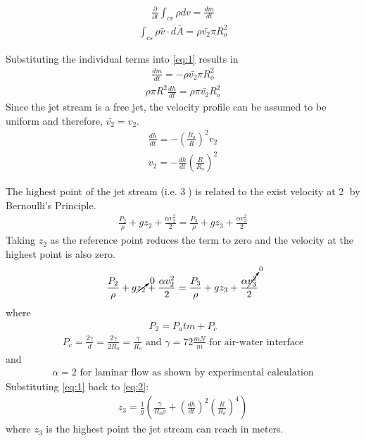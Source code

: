 \documentclass{article}
\begin{document}
\begin{align*}
\frac{\partial}{\partial{t}} \int_{cv} \rho dv = \frac{dm}{dt}
\end{align*}
\begin{align*}
\int_{cs} \rho \bar{v} \cdot d\bar{A} = \rho \bar{v_2} \pi R_o^2
\end{align*}

Substituting the individual terms into \eqref{eq:1} results in
\begin{align*}
\frac{dm}{dt} = - \rho \bar{v_2} \pi R_o^2
\end{align*}
\begin{align*}
\rho \pi R^2 \frac{dh}{dt} = \rho \pi \bar{v_2} R_o^2
\end{align*}
Since the jet stream is a free jet, the velocity profile can be assumed to be uniform and therefore, $\bar{v_2} = v_2$.
\begin{align*}
\frac{dh}{dt} = -(\frac{R_o}{R})^2 v_2
\end{align*}
\begin{align}
v_2 = -\frac{dh}{dt} (\frac{R}{R_o})^2
\end{align}

The highest point of the jet stream (i.e. \textcircled{3}) is related to the exist velocity at \textcircled{2} by Bernoulli's Principle.
\begin{align*}
\frac{P_2}{\rho} + g z_2 + \frac{\alpha v_2^2}{2} = \frac{P_3}{\rho} + g z_3 + \frac{\alpha v_3^2}{2} 
\end{align*}
Taking $z_2$ as the reference point reduces the term to zero and the velocity at the highest point is also zero.
\begin{align}
\frac{P_2}{\rho} + g \cancelto{0}{z_2} + \frac{\alpha v_2^2}{2} = \frac{P_3}{\rho} + g z_3 + \frac{\alpha \cancelto{0}{v_3^2}}{2} \label{eq:2}  
\end{align}
where
\begin{align*}
P_2 = P_atm + P_c
\end{align*}
\begin{align*}
P_c = \frac{2\gamma}{d} = \frac{2\gamma}{2 R_o} = \frac{\gamma}{R_o}  \textrm{ and } \gamma = 72 \frac{mN}{m}  \textrm{ for air-water interface}
\end{align*}
and 
\begin{align*}
\alpha = 2 \textrm{ for laminar flow as shown by experimental calculation}
\end{align*}
Substituting \eqref{eq:1} back to \eqref{eq:2}:
\begin{align*}
z_3 = \frac{1}{g} (\frac{\gamma}{R_o \rho} + (\frac{dh}{dt})^2(\frac{R}{R_o})^4)  
\end{align*}
where $z_3$ is the highest point the jet stream can reach in meters.
\end{document}
